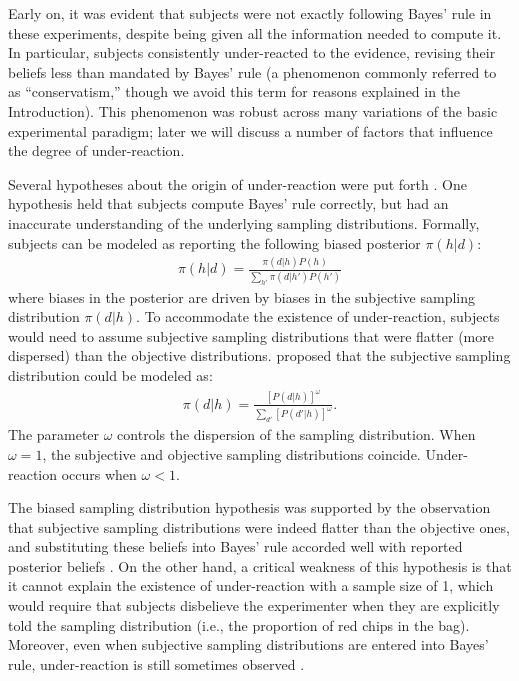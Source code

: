 Early on, it was evident that subjects were not exactly following Bayes' rule in these experiments, despite being given all the information needed to compute it. In particular, subjects consistently under-reacted to the evidence, revising their beliefs less than mandated by Bayes' rule (a phenomenon commonly referred to as ``conservatism,'' though we avoid this term for reasons explained in the Introduction). This phenomenon was robust across many variations of the basic experimental paradigm; later we will discuss a number of factors that influence the degree of under-reaction.

Several hypotheses about the origin of under-reaction were put forth \citep[for a comprehensive review, see][]{benjamin18}. One hypothesis held that subjects compute Bayes' rule correctly, but had an inaccurate understanding of the underlying sampling distributions. Formally, subjects can be modeled as reporting the following biased posterior $\pi(h|d)$:
\begin{align}
    \pi(h|d) = \frac{\pi(d|h)P(h)}{\sum_{h'} \pi(d|h') P(h')}
\end{align}
where biases in the posterior are driven by biases in the subjective sampling distribution $\pi(d|h)$. To accommodate the existence of under-reaction, subjects would need to assume subjective sampling distributions that were flatter (more dispersed) than the objective distributions. \citet{edwards1968conservatism} proposed that the subjective sampling distribution could be modeled as:
\begin{align}
    \pi(d|h) = \frac{[P(d|h)]^\omega}{\sum_{d'} [P(d'|h)]^\omega}.
\end{align}
The parameter $\omega$ controls the dispersion of the sampling distribution. When $\omega=1$, the subjective and objective sampling distributions coincide. Under-reaction occurs when $\omega<1$.

The biased sampling distribution hypothesis was supported by the observation that subjective sampling distributions were indeed flatter than the objective ones, and substituting these beliefs into Bayes' rule accorded well with reported posterior beliefs \citep{peterson1968sampling,wheeler1968subjective}. On the other hand, a critical weakness of this hypothesis is that it cannot explain the existence of under-reaction with a sample size of 1, which would require that subjects disbelieve the experimenter when they are explicitly told the sampling distribution (i.e., the proportion of red chips in the bag). Moreover, even when subjective sampling distributions are entered into Bayes' rule, under-reaction is still sometimes observed \citep[e.g.,][]{grinnell1971bayesian}.


